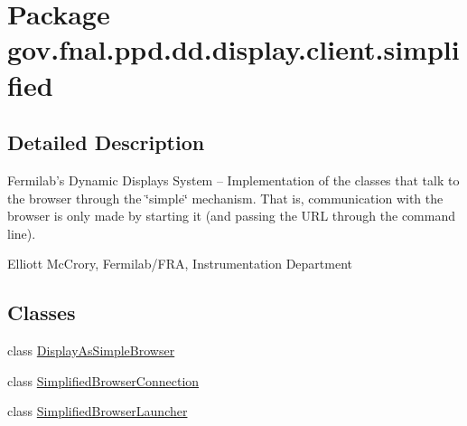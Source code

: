 \hypertarget{namespacegov_1_1fnal_1_1ppd_1_1dd_1_1display_1_1client_1_1simplified}{\section{Package gov.\-fnal.\-ppd.\-dd.\-display.\-client.\-simplified}
\label{namespacegov_1_1fnal_1_1ppd_1_1dd_1_1display_1_1client_1_1simplified}
}


\subsection{Detailed Description}
Fermilab's Dynamic Displays System -- Implementation of the classes that talk to the browser through the \char`\"{}simple\char`\"{} mechanism. That is, communication with the browser is only made by starting it (and passing the U\-R\-L through the command line). 

Elliott Mc\-Crory, Fermilab/\-F\-R\-A, Instrumentation Department \subsection*{Classes}
\begin{DoxyCompactItemize}
\item 
class \hyperlink{classgov_1_1fnal_1_1ppd_1_1dd_1_1display_1_1client_1_1simplified_1_1DisplayAsSimpleBrowser}{Display\-As\-Simple\-Browser}
\item 
class \hyperlink{classgov_1_1fnal_1_1ppd_1_1dd_1_1display_1_1client_1_1simplified_1_1SimplifiedBrowserConnection}{Simplified\-Browser\-Connection}
\item 
class \hyperlink{classgov_1_1fnal_1_1ppd_1_1dd_1_1display_1_1client_1_1simplified_1_1SimplifiedBrowserLauncher}{Simplified\-Browser\-Launcher}
\end{DoxyCompactItemize}
